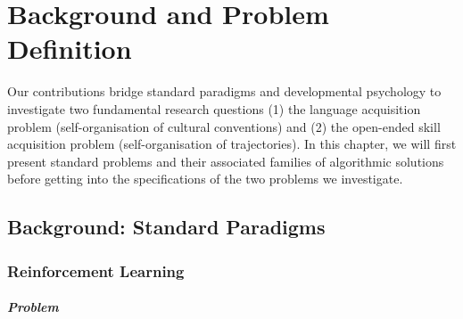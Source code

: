 \chapter{Background and Problem Definition}
\label{chap:backgroud}
\adjustmtc
\minitoc

Our contributions bridge standard \ai paradigms and developmental psychology to investigate two fundamental research questions  (1) the language acquisition problem (self-organisation of cultural conventions) and (2) the open-ended skill acquisition problem (self-organisation of trajectories). In this chapter, we will first present standard \ai problems and their associated families of algorithmic solutions before getting into the specifications of the two problems we investigate.

\section{Background: Standard \ai Paradigms}

\label{sec:standard_ai}

\subsection{Reinforcement Learning}

\label{sec:background_rl}

\paragraph{Problem}

